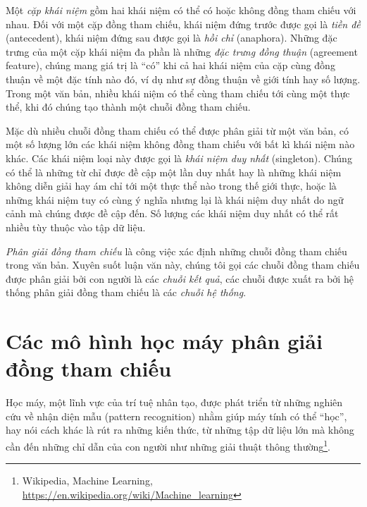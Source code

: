 Một \emph{cặp khái niệm} gồm hai khái niệm có thể có hoặc không đồng tham chiếu với nhau. Đối với một cặp đồng tham chiếu, khái niệm đứng trước được gọi là \emph{tiền đề} (antecedent), khái niệm đứng sau được gọi là \emph{hồi chỉ} (anaphora). Những đặc trưng của một cặp khái niệm đa phần là những \emph{đặc trưng đồng thuận} (agreement feature), chúng mang giá trị là ``có'' khi cả hai khái niệm của cặp cùng đồng thuận về một đặc tính nào đó, ví dụ như sự đồng thuận về giới tính hay số lượng. Trong một văn bản, nhiều khái niệm có thể cùng tham chiếu tới cùng một thực thể, khi đó chúng tạo thành một chuỗi đồng tham chiếu.

Mặc dù nhiều chuỗi đồng tham chiếu có thể được phân giải từ một văn bản, có một số lượng lớn các khái niệm không đồng tham chiếu với bất kì khái niệm nào khác. Các khái niệm loại này được gọi là \emph{khái niệm duy nhất} (singleton). Chúng có thể là những từ chỉ được đề cập một lần duy nhất hay là những khái niệm không diễn giải hay ám chỉ tới một thực thể nào trong thế giới thực, hoặc là những khái niệm tuy có cùng ý nghĩa nhưng lại là khái niệm duy nhất do ngữ cảnh mà chúng được đề cập đến. Số lượng các khái niệm duy nhất có thể rất nhiều tùy thuộc vào tập dữ liệu.

\emph{Phân giải đồng tham chiếu} là công việc xác định những chuỗi đồng tham chiếu trong văn bản. Xuyên suốt luận văn này, chúng tôi gọi các chuỗi đồng tham chiếu được phân giải bởi con người là các \emph{chuỗi kết quả}, các chuỗi được xuất ra bởi hệ thống phân giải đồng tham chiếu là các \emph{chuỗi hệ thống}.

\section{Các mô hình học máy phân giải đồng tham chiếu\label{coref-model}}
Học máy, một lĩnh vực của trí tuệ nhân tạo, được phát triển từ những nghiên cứu về nhận diện mẫu (pattern recognition) nhằm giúp máy tính có thể ``học'', hay nói cách khác là rút ra những kiến thức, từ những tập dữ liệu lớn mà không cần đến những chỉ dẫn của con người như những giải thuật thông thường\footnote{Wikipedia, Machine Learning, \url{https://en.wikipedia.org/wiki/Machine_learning}}. 

